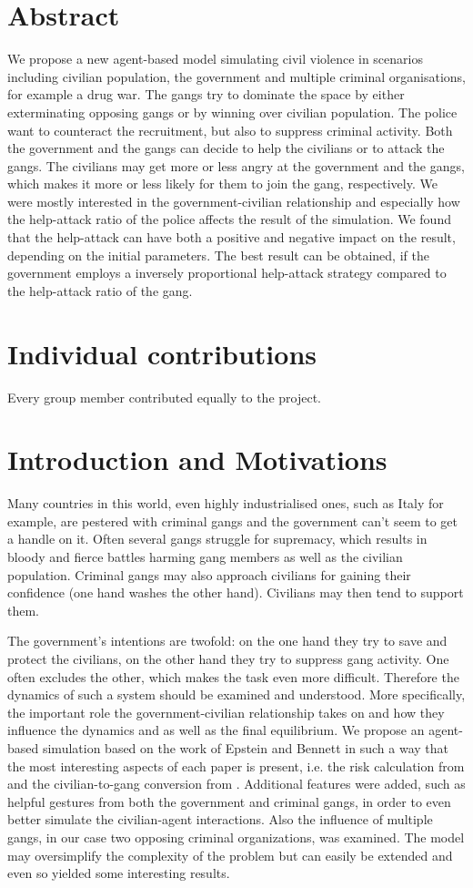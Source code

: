 \documentclass[11pt]{article}
\begin{document}
\section{Abstract}
We propose a new agent-based model simulating civil violence in scenarios including civilian population, the government and multiple criminal organisations, for example a drug war. The gangs try to dominate the space by either exterminating opposing gangs or by winning over civilian population. The police want to counteract the recruitment, but also to suppress criminal activity. Both the government and the gangs can decide to help the civilians or to attack the gangs. The civilians may get more or less angry at the government and the gangs, which makes it more or less likely for them to join the gang, respectively.  We were mostly interested in the government-civilian relationship and especially how the help-attack ratio of the police affects the result of the simulation.
We found that the help-attack can have both a positive and negative impact on the result, depending on the initial parameters. The best result can be obtained, if the government employs a inversely proportional help-attack strategy compared to the help-attack ratio of the gang.
\section{Individual contributions}
Every group member contributed equally to the project.
\section{Introduction and Motivations}
Many countries in this world, even highly industrialised ones, such as Italy for example, are pestered with criminal gangs and the government can't seem to get a handle on it. Often several gangs struggle for supremacy, which results in bloody and fierce battles harming gang members as well as the civilian population. Criminal gangs may also approach civilians for gaining their confidence (one hand washes the other hand). Civilians may then tend to support them. 

The government's intentions are twofold: on the one hand they try to save and protect the civilians, on the other hand they try to suppress gang activity. One often excludes the other, which makes the task even more difficult. Therefore the dynamics of such a system should be examined and understood. More specifically, the important role the government-civilian relationship takes on and how they influence the dynamics and as well as the final equilibrium. We propose an agent-based simulation based on the work of Epstein \cite{epstein} and Bennett \cite{bennett} in such a way that the most interesting aspects of each paper is present, i.e. the risk calculation from \cite{epstein} and the civilian-to-gang conversion from \cite{bennett}. Additional features were added, such as helpful gestures from both the government and criminal gangs, in order to even better simulate the civilian-agent interactions. Also the influence of multiple gangs, in our case two opposing criminal organizations, was examined. The model may oversimplify the complexity of the problem but can easily be extended and even so yielded some interesting results. 
\end{document}
